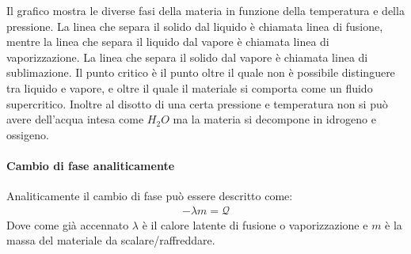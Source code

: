                 Il grafico mostra le diverse fasi della materia in funzione della temperatura e della pressione. La linea che separa il solido dal liquido è chiamata linea di fusione, mentre la linea che separa il liquido dal vapore è chiamata linea di vaporizzazione. La linea che separa il solido dal vapore è chiamata linea di sublimazione. Il punto critico è il punto oltre il quale non è possibile distinguere tra liquido e vapore, e oltre il quale il materiale si comporta come un fluido supercritico. Inoltre al disotto di una certa pressione e temperatura non si può avere dell'acqua intesa come $H_2O$ ma la materia si decompone in idrogeno e ossigeno.
            \paragraph{Cambio di fase analiticamente}
                Analiticamente il cambio di fase può essere descritto come:
                \begin{align}
                    -\lambda m = \mathcal{Q}
                \end{align}
                Dove come già accennato $\lambda$ è il calore latente di fusione o vaporizzazione e $m$ è la massa del materiale da scalare/raffreddare. 
